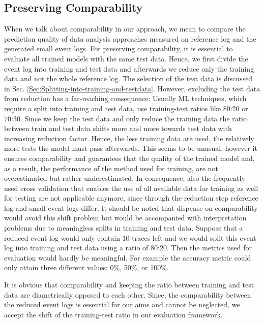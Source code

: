 \documentclass[runningheads]{llncs}
\begin{document}
\subsection{Preserving Comparability}\label{Sec:Preserving-comparability}
\vspace{-7pt}
When we talk about comparability in our approach, we mean to compare the prediction quality of data analysis approaches measured on reference log and the generated small event logs. For preserving comparability, it is essential to evaluate all trained models with the same test data. Hence, we first divide the event log into training and test data and afterwards we reduce only the training data and not the whole reference log. The selection of the test data is discussed in Sec. \ref{Sec:Splitting-into-training-and-testdata}. However, excluding the test data from reduction has a far-reaching consequence: Usually ML techniques, which require a split into training and test data, use training-test ratios like 80:20 or 70:30. Since we keep the test data and only reduce the training data the ratio between train and test data shifts more and more towards test data with increasing reduction factor. Hence, the less training data are used, the relatively more tests the model must pass afterwards. This seems to be unusual, however it ensures comparability and guarantees that the quality of the trained model and, as a result, the performance of the method used for training, are not overestimated but rather underestimated. In consequence, also the frequently used cross validation that enables the use of all available data for training as well for testing are not applicable anymore, since through the reduction step reference log and small event logs differ. It should be noted that dispense on comparability would avoid this shift problem but would be accompanied with interpretation problems due to meaningless splits in training and test data. Suppose that a reduced event log would only contain 10 traces left and we would split this event log into training and test data using a ratio of 80:20. Then the metrics used for evaluation would hardly be meaningful. For example the accuracy metric could only attain three different values: 0\%, 50\%, or 100\%. 

It is obvious that comparability and keeping the ratio between training and test data are diametrically opposed to each other. Since, the comparability between the reduced event logs is essential for our aims and cannot be neglected, we accept the shift of the training-test ratio in our evaluation framework. 
\vspace{-5pt}
\end{document}
